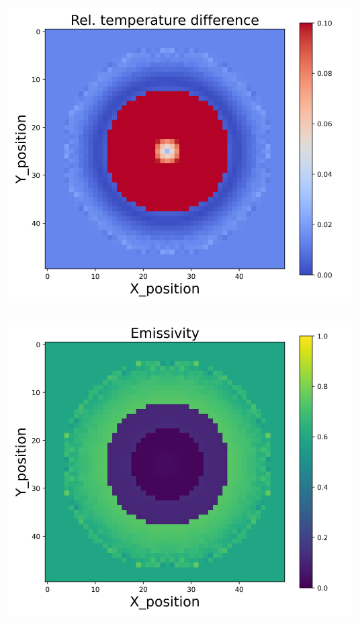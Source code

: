 \begin{figure}[htbp]
\begin{minipage}{\textwidth}
\begin{subfigure}{0.325\textwidth}
            \includegraphics[width=\textwidth]{figures/raw_data/21/linear/T_bias.jpg}
        \end{subfigure}
        \begin{subfigure}{0.325\textwidth}
            \centering
            \includegraphics[width=\textwidth]{figures/raw_data/21/linear/emi_cal.jpg}
        \end{subfigure}
    \end{minipage}\\

\end{figure}

